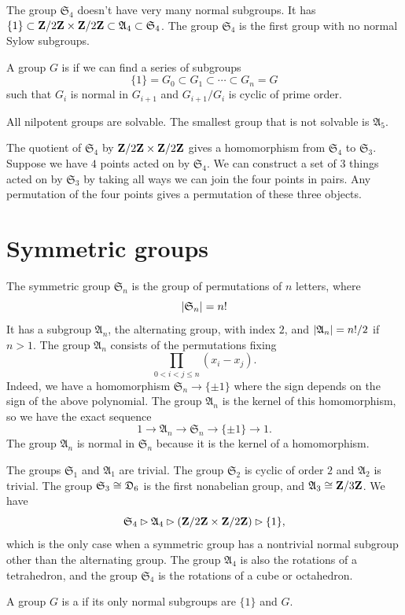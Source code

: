 \documentclass[11pt, twoside]{amsart}
\begin{document}
The group $\mathfrak{S}_4$ doesn't have very many normal subgroups. It has $\{1\} \subset \mathbf{Z}/2\mathbf{Z}  \times \mathbf{Z}/2\mathbf{Z} \subset \mathfrak{A}_4 \subset \mathfrak{S}_4$. The group $\mathfrak{S}_4$ is the first group with no normal Sylow subgroups.
\begin{definition}
A group $G$ is  if we can find a series of subgroups
$$
\{1\} = G_0 \subset G_1 \subset \cdots \subset G_n = G
$$
such that $G_i$ is normal in $G_{i+1}$ and $G_{i+1} / G_i$ is cyclic of prime order.
\end{definition}

All nilpotent groups are solvable. The smallest group that is not solvable is $\mathfrak{A}_5$. 

The quotient of $\mathfrak{S}_4$ by $\mathbf{Z}/2\mathbf{Z} \times \mathbf{Z}/2\mathbf{Z} $ gives a homomorphism from $\mathfrak{S}_4 $ to $ \mathfrak{S}_3$. Suppose we have $4$ points acted on by $\mathfrak{S}_4$. We can construct a set of $3$ things acted on by $\mathfrak{S}_3$ by taking all ways we can join the four points in pairs. Any permutation of the four points gives a permutation of these three objects.
\section{Symmetric groups}
The symmetric group $\mathfrak{S}_n$ is the group of permutations of $n$ letters, where
$$
\abs{\mathfrak{S}_n} = n!%
$$ 
It has a subgroup $\mathfrak{A}_n$, the alternating group, with index $2$, and $\left \lvert \mathfrak{A}_n \right \rvert = n!/2$ if $n>1$. The group $\mathfrak{A}_n$ consists of the permutations fixing 
$$
\prod_{0<i<j\le n} (x_i - x_j).
$$
Indeed, we have a homomorphism $\mathfrak{S}_n \longrightarrow \{\pm 1\}$ where the sign depends on the sign of the above polynomial. The group $\mathfrak{A}_n$ is the kernel of this homomorphism, so we have the exact sequence
$$
1 \longrightarrow \mathfrak{A}_n \longrightarrow \mathfrak{S}_n \longrightarrow \{\pm 1\} \longrightarrow 1.
$$
The group $\mathfrak{A}_n$ is normal in $\mathfrak{S}_n$ because it is the kernel of a homomorphism.

The groups $\mathfrak{S}_1$ and $\mathfrak{A}_1$ are trivial. The group $\mathfrak{S}_2$ is cyclic of order $2$ and $\mathfrak{A}_2$ is trivial. The group $\mathfrak{S}_3\cong \mathfrak{D}_6$ is the first nonabelian group, and $\mathfrak{A}_3\cong \mathbf{Z}/3\mathbf{Z} $. We have 
$$\mathfrak{S}_4 \rhd \mathfrak{A}_4 \rhd (\mathbf{Z}/2\mathbf{Z}\times \mathbf{Z}/2\mathbf{Z} ) \rhd \{1\},$$ which is the only case when a symmetric group has a nontrivial normal subgroup other than the alternating group. The group $\mathfrak{A}_4$ is also the rotations of a tetrahedron, and the group $\mathfrak{S}_4$ is the rotations of a cube or octahedron. 
\begin{definition}
A group $G$ is a  if its only normal subgroups are $\{1\}$ and $G$.
\end{definition}
\end{document}
